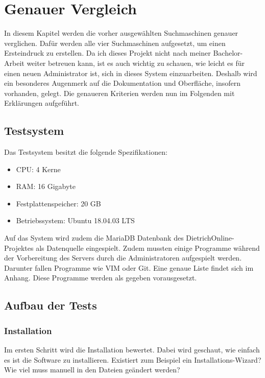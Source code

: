 \chapter{Genauer Vergleich}

In diesem Kapitel werden die vorher ausgewählten Suchmaschinen genauer verglichen. Dafür werden alle vier Suchmaschinen aufgesetzt, um einen Ersteindruck zu erstellen. Da ich dieses Projekt nicht nach meiner Bachelor-Arbeit weiter betreuen kann, ist es auch wichtig zu schauen, wie leicht  es für einen neuen Administrator ist, sich in dieses System einzuarbeiten. Deshalb wird ein besonderes Augenmerk auf die Dokumentation und Oberfläche, insofern vorhanden, gelegt. Die genaueren Kriterien werden nun im Folgenden mit Erklärungen aufgeführt.

\section{Testsystem}
Das Testsystem besitzt die folgende Spezifikationen:

\begin{itemize}
    \item CPU: 4 Kerne
    \item RAM: 16 Gigabyte
    \item Festplattenspeicher: 20 GB
    \item Betriebssystem: Ubuntu 18.04.03 LTS
\end{itemize} 

Auf das System wird zudem die MariaDB Datenbank des DietrichOnline-Projektes als Datenquelle eingespielt. Zudem mussten einige Programme während der Vorbereitung des Servers durch die Administratoren aufgespielt werden. Darunter fallen Programme wie VIM oder Git. Eine genaue Liste findet sich im Anhang. Diese Programme werden als gegeben vorausgesetzt.

\section{Aufbau der Tests}

\subsection{Installation}

Im ersten Schritt wird die Installation bewertet. Dabei wird geschaut, wie einfach es ist die Software zu installieren. Existiert zum Beispiel ein Installations-Wizard? Wie viel muss manuell in den Dateien geändert werden?

